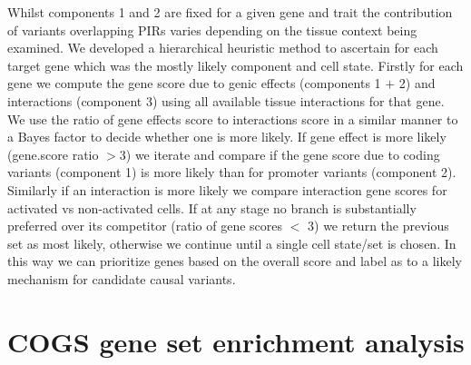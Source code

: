 \documentclass[a4paper,11pt]{book}
\begin{document}
Whilst components 1 and 2 are fixed for a given gene and trait the contribution of variants overlapping PIRs varies depending on the tissue context being examined. We developed a hierarchical heuristic method to ascertain for each target gene which was the mostly likely component and cell state. Firstly for each gene we compute the gene score due to genic effects (components 1 $+$ 2) and interactions (component 3) using all available tissue interactions for that gene. We use the ratio of gene effects score to interactions score in a similar manner to a Bayes factor to decide whether one is more likely. If gene effect is more likely (gene.score ratio $>$3) we iterate and compare if the gene score due to coding variants (component 1) is more likely than for promoter variants (component 2). Similarly if an interaction is more likely we compare interaction gene scores for activated vs non-activated cells. If at any stage no branch is substantially preferred over its competitor (ratio of gene scores $<$ 3) we return the previous set as most likely, otherwise we continue until a single cell state/set is chosen. In this way we can prioritize genes based on the overall score and label as to a likely mechanism for candidate causal variants.



\section{COGS gene set enrichment analysis}
\end{document}
